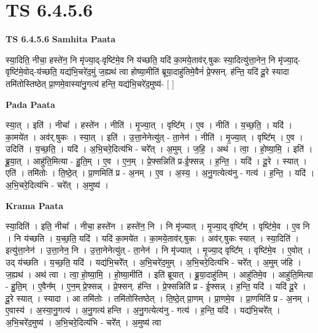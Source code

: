 \documentclass[17pt]{extarticle}
\begin{document}
\section{ TS 6.4.5.6 }

\textbf{TS 6.4.5.6 } \newline
\textbf{Samhita Paata} \newline

स्या॒दिति॒ नीचा॒ हस्ते॑न॒ नि मृ॑ज्या॒द्-वृष्टि॑मे॒व नि य॑च्छति॒ यदि॑ का॒मये॒ताव॑र्.षुकः स्या॒दित्यु॑त्ता॒नेन॒ नि मृ॑ज्या॒द्-वृष्टि॑मे॒वोद्-य॑च्छति॒ यद्य॑भि॒चरे॑द॒मुं ज॒ह्यथ॑ त्वा होष्या॒मीति॑ ब्रूया॒दाहु॑तिमे॒वैनं॑ प्रे॒फ्सन्. ह॑न्ति॒ यदि॑ दू॒रे स्यादा तमि॑तोस्तिष्ठेत् प्रा॒णमे॒वास्या॑नु॒गत्य॑ हन्ति॒ यद्य॑भि॒चरे॑द॒मुष्य॑- [  ] \newline

\textbf{Pada Paata} \newline

स्या॒त् । इति॑ । नीचा᳚ । हस्ते॑न । नीति॑ । मृ॒ज्या॒त् । वृष्टि᳚म् । ए॒व । नीति॑ । य॒च्छ॒ति॒ । यदि॑ । का॒मये॑त । अव॑र्.षुकः । स्या॒त् । इति॑ । उ॒त्ता॒नेनेत्यु॑त् - ता॒नेन॑ । नीति॑ । मृ॒ज्या॒त् । वृष्टि᳚म् । ए॒व । उदिति॑ । य॒च्छ॒ति॒ । यदि॑ । अ॒भि॒चरे॒दित्य॑भि - चरे᳚त् । अ॒मुम् । ज॒हि॒ । अथ॑ । त्वा॒ । हो॒ष्या॒मि॒ । इति॑ । ब्रू॒या॒त् । आहु॑ति॒मित्या - हु॒ति॒म् । ए॒व । ए॒न॒म् । प्रे॒फ्सन्निति॑ प्र-ई॒फ्सन्न् । ह॒न्ति॒ । यदि॑ । दू॒रे । स्यात् । एति॑ । तमि॑तोः । ति॒ष्ठे॒त् । प्रा॒णमिति॑ प्र - अ॒नम् । ए॒व । अ॒स्य॒ । अ॒नु॒गत्येत्य॑नु - गत्य॑ । ह॒न्ति॒ । यदि॑ । अ॒भि॒चरे॒दित्य॑भि - चरे᳚त् । अ॒मुष्य॑ ।  \newline


\textbf{Krama Paata} \newline

स्या॒दिति॑ । इति॒ नीचा᳚ । नीचा॒ हस्ते॑न । हस्ते॑न॒ नि । नि मृ॑ज्यात् । मृ॒ज्या॒द् वृष्टि᳚म् । वृष्टि॑मे॒व । ए॒व नि । नि य॑च्छति । य॒च्छ॒ति॒ यदि॑ । यदि॑ का॒मये॑त । का॒मये॒ताव॑र्.षुकः । अव॑र्.षुकः स्यात् । स्या॒दिति॑ । इत्यु॑त्ता॒नेन॑ । उ॒त्ता॒नेन॒ नि । उ॒त्ता॒नेनेत्यु॑त् - ता॒नेन॑ । नि मृ॑ज्यात् । मृ॒ज्या॒द् वृष्टि᳚म् । वृष्टि॑मे॒व । ए॒वोत् । उद् य॑च्छति । य॒च्छ॒ति॒ यदि॑ । यद्य॑भि॒चरे᳚त् । अ॒भि॒चरे॑द॒मुम् । अ॒भि॒चरे॒दित्य॑भि - चरे᳚त् । अ॒मुम् ज॑हि । ज॒ह्यथ॑ । अथ॑ त्वा । त्वा॒ हो॒ष्या॒मि॒ । हो॒ष्या॒मीति॑ । इति॑ ब्रूयात् । ब्रू॒या॒दाहु॑तिम् । आहु॑तिमे॒व । आहु॑ति॒मित्या - हु॒ति॒म् । ए॒वैन᳚म् । ए॒न॒म् प्रे॒फ्सन्न् । प्रे॒फ्सन्. ह॑न्ति । प्रे॒फ्सन्निति॑ प्र - ई॒फ्सन्न् । ह॒न्ति॒ यदि॑ । यदि॑ दू॒रे । दू॒रे स्यात् । स्यादा । आ तमि॑तोः । तमि॑तोस्तिष्ठेत् । ति॒ष्ठे॒त् प्रा॒णम् । प्रा॒णमे॒व । प्रा॒णमिति॑ प्र - अ॒नम् । ए॒वास्य॑ । अ॒स्या॒नु॒गत्य॑ । अ॒नु॒गत्य॑ हन्ति । अ॒नु॒गत्येत्य॑नु - गत्य॑ । ह॒न्ति॒ यदि॑ । यद्य॑भि॒चरे᳚त् । अ॒भि॒चरे॑द॒मुष्य॑ । अ॒भि॒चरे॒दित्य॑भि - चरे᳚त् । अ॒मुष्य॑ त्वा \newline
\end{document}

